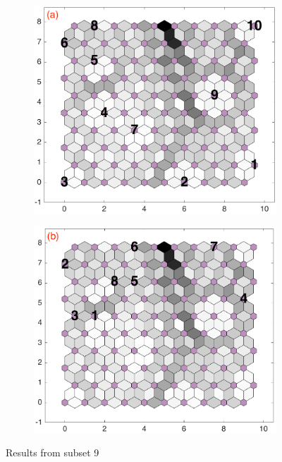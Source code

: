 \begin{figure}
 \begin{subfigure}[b]{0.5\textwidth}
        \centering
        \includegraphics[width=\textwidth]{../../images0.01/M31/2D/image_subsets/subset9_dist_with_hits_t.png}
    \end{subfigure}
    \hfill
    \begin{subfigure}[b]{0.5\textwidth}
    \includegraphics[width=\textwidth]{../../images0.01/M31/2D/image_subsets/subset9_dist_with_hits_v.png}
    \end{subfigure}
    \caption{Results from subset 9}
    \label{fig: subset9}
\end{figure}
